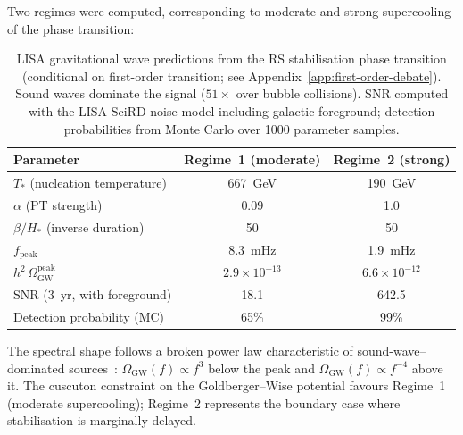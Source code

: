 \noindent{}

Two regimes were computed, corresponding to moderate and strong supercooling of the phase transition:

\begin{table}[ht]
\centering
\caption{LISA gravitational wave predictions from the RS stabilisation phase transition (conditional on first-order transition; see Appendix~\ref{app:first-order-debate}). Sound waves dominate the signal ($51\times$ over bubble collisions). SNR computed with the LISA SciRD noise model including galactic foreground; detection probabilities from Monte Carlo over 1000 parameter samples.}
\label{tab:5-LISA}
\small
\begin{tabular}{lcc}
\toprule
Parameter & Regime~1 (moderate) & Regime~2 (strong) \\
\midrule
$T_*$ (nucleation temperature) & 667~GeV & 190~GeV \\
$\alpha$ (PT strength) & 0.09 & 1.0 \\
$\beta/H_*$ (inverse duration) & 50 & 50 \\
$f_\mathrm{peak}$ & 8.3~mHz & 1.9~mHz \\
$h^2\,\Omega_\mathrm{GW}^\mathrm{peak}$ & $2.9 \times 10^{-13}$ & $6.6 \times 10^{-12}$ \\
SNR (3~yr, with foreground) & 18.1 & 642.5 \\
Detection probability (MC) & 65\% & 99\% \\
\bottomrule
\end{tabular}
\end{table}

The spectral shape follows a broken power law characteristic of sound-wave--dominated sources~\cite{ch5:Hindmarsh2015}: $\Omega_\mathrm{GW}(f) \propto f^3$ below the peak and $\Omega_\mathrm{GW}(f) \propto f^{-4}$ above it. The cuscuton constraint on the Goldberger--Wise potential favours Regime~1 (moderate supercooling); Regime~2 represents the boundary case where stabilisation is marginally delayed.

